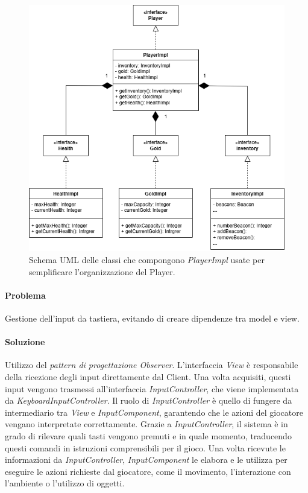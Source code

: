 \documentclass{report}
\begin{document}
\begin{figure}[H]
    \centering
    \includegraphics[width=13cm]{PlayerImpl.png}
    \caption{Schema UML delle classi che compongono \textit{PlayerImpl} usate per semplificare l'organizzazione del Player.}
    \label{img:PlayerImpl.png}
\end{figure}

\paragraph{Problema} Gestione dell’input da tastiera, evitando di creare dipendenze tra model e view.

\paragraph{Soluzione} Utilizzo del \textit{pattern di progettazione Observer}. \newline
%
L’interfaccia \textit{View} è responsabile della ricezione degli input direttamente dal Client. Una volta acquisiti, questi input vengono trasmessi all’interfaccia \textit{InputController}, 
%
che viene implementata da \textit{KeyboardInputController}. 
%
Il ruolo di \textit{InputController} è quello di fungere da intermediario tra \textit{View} e \textit{InputComponent}, garantendo che le azioni del giocatore vengano interpretate correttamente. \newline 
%
Grazie a \textit{InputController}, il sistema è in grado di rilevare quali tasti vengono premuti e in quale momento, traducendo questi comandi in istruzioni comprensibili per il gioco.
%
Una volta ricevute le informazioni da \textit{InputController}, \textit{InputComponent} le elabora e le utilizza per eseguire le azioni richieste dal giocatore, come il movimento, l’interazione 
%
con l’ambiente o l’utilizzo di oggetti.
\end{document}
